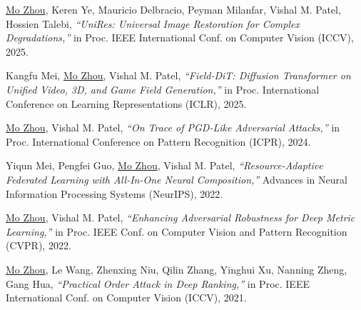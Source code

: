 \documentclass[10pt,margin,line,pifont,palatino,courier]{res}
\begin{document}
\begin{resume}
\begin{enumerate}[noitemsep, leftmargin=*, label={[C{\arabic*}]}]
\item \underline{Mo Zhou}, Keren Ye, Mauricio Delbracio, Peyman Milanfar,
\reversemarginpar{}
Vishal M. Patel, Hossien Talebi,
\textit{``UniRes: Universal Image Restoration for Complex Degradations,''}
in Proc. IEEE International Conf. on Computer Vision (ICCV), 2025.

\item Kangfu Mei, \underline{Mo Zhou}, Vishal M. Patel,
\reversemarginpar{}
\textit{``Field-DiT: Diffusion Transformer on Unified Video, 3D, and Game Field Generation,''}
in Proc. International Conference on Learning Representations (ICLR), 2025.

\item \underline{Mo Zhou}, Vishal M. Patel,
\reversemarginpar{}
\textit{``On Trace of PGD-Like Adversarial Attacks,''}
in Proc. International Conference on Pattern Recognition (ICPR), 2024.

\item Yiqun Mei, Pengfei Guo, \underline{Mo Zhou}, Vishal M. Patel,
\reversemarginpar{}
\textit{``Resource-Adaptive Federated Learning with All-In-One Neural Composition,''}
Advances in Neural Information Processing Systems (NeurIPS), 2022.

\item \underline{Mo Zhou}, Vishal M. Patel,
\reversemarginpar{}
\textit{``Enhancing Adversarial Robustness for Deep Metric Learning,''}
in Proc. IEEE Conf. on Computer Vision and Pattern Recognition (CVPR), 2022.

\item \underline{Mo Zhou},
\reversemarginpar{}
Le Wang, Zhenxing Niu, Qilin Zhang, Yinghui Xu, Nanning Zheng, Gang Hua,
\textit{``Practical Order Attack in Deep Ranking,''}
in Proc. IEEE International Conf. on Computer Vision (ICCV), 2021.


\end{enumerate}
\end{resume}
\end{document}
